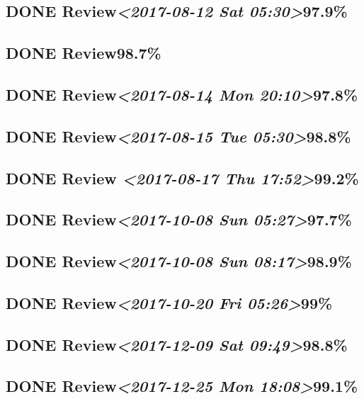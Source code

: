 \documentclass[11pt]{ctexart}
\begin{document}
\subsection{{\bfseries\sffamily DONE} Review\textit{<2017-08-12 Sat 05:30>}97.9\%}
\label{sec:orgf3364d7}
\subsection{{\bfseries\sffamily DONE} Review98.7\%}
\label{sec:org26ba393}
\subsection{{\bfseries\sffamily DONE} Review\textit{<2017-08-14 Mon 20:10>}97.8\%}
\label{sec:org36c0efc}
\subsection{{\bfseries\sffamily DONE} Review\textit{<2017-08-15 Tue 05:30>}98.8\%}
\label{sec:org3e1083b}
\subsection{{\bfseries\sffamily DONE} Review \textit{<2017-08-17 Thu 17:52>}99.2\%}
\label{sec:orgf2f4d90}
\subsection{{\bfseries\sffamily DONE} Review\textit{<2017-10-08 Sun 05:27>}97.7\%}
\label{sec:orgd297275}
\subsection{{\bfseries\sffamily DONE} Review\textit{<2017-10-08 Sun 08:17>}98.9\%}
\label{sec:org3882115}
\subsection{{\bfseries\sffamily DONE} Review\textit{<2017-10-20 Fri 05:26>}99\%}
\label{sec:org25dd2ab}

\subsection{{\bfseries\sffamily DONE} Review\textit{<2017-12-09 Sat 09:49>}98.8\%}
\label{sec:orgb5b722a}
\subsection{{\bfseries\sffamily DONE} Review\textit{<2017-12-25 Mon 18:08>}99.1\%}
\label{sec:org8443da3}
\end{document}
